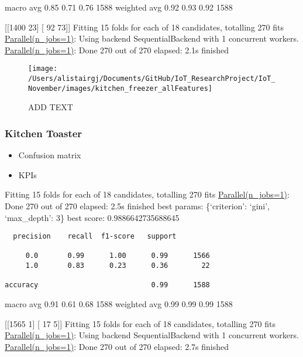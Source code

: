 \documentclass[11pt,]{article}
\providecommand{\tightlist}{%
  \setlength{\itemsep}{0pt}\setlength{\parskip}{0pt}}
\begin{document}
macro avg 0.85 0.71 0.76 1588 weighted avg 0.92 0.93 0.92 1588

{[}{[}1400 23{]} {[} 92 73{]}{]} Fitting 15 folds for each of 18
candidates, totalling 270 fits
\href{Done\%20270\%20out\%20of\%20270\%20\%7C\%20elapsed:\%202.1s\%20finished}{Parallel(n\_jobs=1)}:
Using backend SequentialBackend with 1 concurrent workers.
\href{Done\%20270\%20out\%20of\%20270\%20\%7C\%20elapsed:\%202.1s\%20finished}{Parallel(n\_jobs=1)}:
Done 270 out of 270 \textbar{} elapsed: 2.1s finished

\begin{figure}[H]

{\centering \texttt{[image: /Users/alistairgj/Documents/GitHub/IoT\_ResearchProject/IoT\_November/images/kitchen\_freezer\_allFeatures]} 

}

\caption{ADD TEXT}\label{fig:unnamed-chunk-3}
\end{figure}

\pagebreak

\hypertarget{kitchen-toaster}{%
\subsubsection{Kitchen Toaster}\label{kitchen-toaster}}

\begin{itemize}
\tightlist
\item
  Confusion matrix
\item
  KPIs
\end{itemize}

Fitting 15 folds for each of 18 candidates, totalling 270 fits
\href{Done\%20270\%20out\%20of\%20270\%20\%7C\%20elapsed:\%202.1s\%20finished}{Parallel(n\_jobs=1)}:
Done 270 out of 270 \textbar{} elapsed: 2.5s finished best params:
\{`criterion': `gini', `max\_depth': 3\} best score: 0.9886642735688645

\begin{verbatim}
  precision    recall  f1-score   support

     0.0       0.99      1.00      0.99      1566
     1.0       0.83      0.23      0.36        22

accuracy                           0.99      1588
\end{verbatim}

macro avg 0.91 0.61 0.68 1588 weighted avg 0.99 0.99 0.99 1588

{[}{[}1565 1{]} {[} 17 5{]}{]} Fitting 15 folds for each of 18
candidates, totalling 270 fits
\href{Done\%20270\%20out\%20of\%20270\%20\%7C\%20elapsed:\%202.1s\%20finished}{Parallel(n\_jobs=1)}:
Using backend SequentialBackend with 1 concurrent workers.
\href{Done\%20270\%20out\%20of\%20270\%20\%7C\%20elapsed:\%202.1s\%20finished}{Parallel(n\_jobs=1)}:
Done 270 out of 270 \textbar{} elapsed: 2.7s finished
\end{document}
